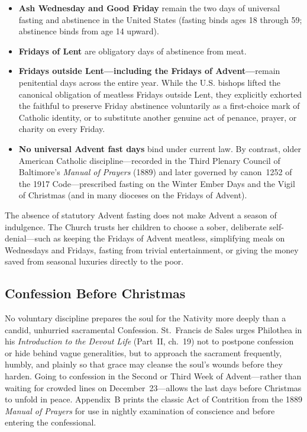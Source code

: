 \begin{itemize}
  \item \textbf{Ash Wednesday and Good Friday} remain the two days of universal fasting and abstinence in the United States (fasting binds ages 18 through 59; abstinence binds from age 14 upward).
  \item \textbf{Fridays of Lent} are obligatory days of abstinence from meat.
  \item \textbf{Fridays outside Lent---including the Fridays of Advent---}remain penitential days across the entire year. While the U.S. bishops lifted the canonical obligation of meatless Fridays outside Lent, they explicitly exhorted the faithful to preserve Friday abstinence voluntarily as a first-choice mark of Catholic identity, or to substitute another genuine act of penance, prayer, or charity on every Friday.
  \item \textbf{No universal Advent fast days} bind under current law. By contrast, older American Catholic discipline---recorded in the Third Plenary Council of Baltimore's \textit{Manual of Prayers} (1889) and later governed by canon~1252 of the 1917 Code---prescribed fasting on the Winter Ember Days and the Vigil of Christmas (and in many dioceses on the Fridays of Advent).
\end{itemize}

The absence of statutory Advent fasting does not make Advent a season of indulgence. The Church trusts her children to choose a sober, deliberate self-denial---such as keeping the Fridays of Advent meatless, simplifying meals on Wednesdays and Fridays, fasting from trivial entertainment, or giving the money saved from seasonal luxuries directly to the poor.

\subsection{Confession Before Christmas}

No voluntary discipline prepares the soul for the Nativity more deeply than a candid, unhurried sacramental Confession. St.~Francis de Sales urges Philothea in his \textit{Introduction to the Devout Life} (Part~II, ch.~19) not to postpone confession or hide behind vague generalities, but to approach the sacrament frequently, humbly, and plainly so that grace may cleanse the soul's wounds before they harden. Going to confession in the Second or Third Week of Advent---rather than waiting for crowded lines on December~23---allows the last days before Christmas to unfold in peace. Appendix~B prints the classic Act of Contrition from the 1889 \textit{Manual of Prayers} for use in nightly examination of conscience and before entering the confessional.


